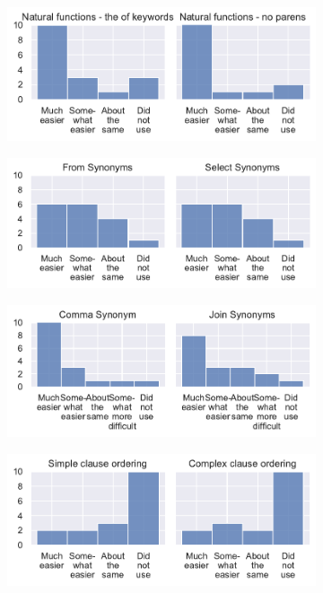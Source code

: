 \begin{figure}[ht]
  \centering
  \begin{subfigure}{0.5\linewidth}
    \centering
    \includegraphics[width=\linewidth]{figures/survey-feedback/function-feedback.pdf}
  \end{subfigure}%
  \begin{subfigure}{0.5\linewidth}
    \centering
    \includegraphics[width=\linewidth]{figures/survey-feedback/synonym-feedback-1.pdf}
  \end{subfigure}
  \begin{subfigure}{0.5\linewidth}
    \centering
    \includegraphics[width=\linewidth]{figures/survey-feedback/synonym-feedback-2.pdf}
  \end{subfigure}%
  \begin{subfigure}{0.5\linewidth}
    \centering
    \includegraphics[width=\linewidth]{figures/survey-feedback/ordering-feedback-1.pdf}

\end{subfigure}
\end{figure}
